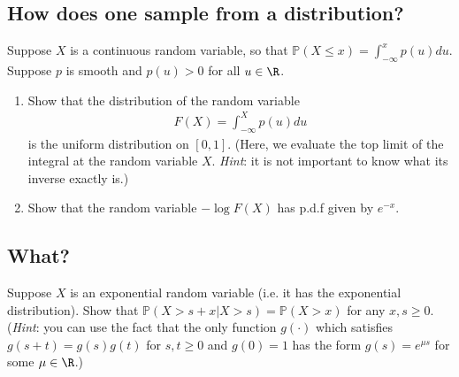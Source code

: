 \documentclass[12pt,reqno]{amsart}
\theoremstyle{definition}
\theoremstyle{remark}
\numberwithin{equation}{section}
\begin{document}
\subsection{How does one sample from a distribution?}
Suppose $X$ is a continuous random variable, so that $\mathbb{P}(X\leq x)=\int_{-\infty}^{x}p(u)du$. Suppose $p$ is smooth and $p(u)>0$ for all $u\in\R$.
\begin{enumerate}
\item Show that the distribution of the random variable 
%
\begin{align*}
F(X)=\int_{-\infty}^{X}p(u)du
\end{align*}
%
is the uniform distribution on $[0,1]$. (Here, we evaluate the top limit of the integral at the random variable $X$. \emph{Hint}: it is not important to know what its inverse exactly is.)
\item Show that the random variable $-\log F(X)$ has p.d.f given by $e^{-x}$.
\end{enumerate}
\subsection{What?}
Suppose $X$ is an exponential random variable (i.e. it has the exponential distribution). Show that $\mathbb{P}(X>s+x|X>s)=\mathbb{P}(X>x)$ for any $x,s\geq0$. (\emph{Hint}: you can use the fact that the only function $g(\cdot)$ which satisfies $g(s+t)=g(s)g(t)$ for $s,t\geq0$ and $g(0)=1$ has the form $g(s)=e^{\mu s}$ for some $\mu\in\R$.)
\end{document}

